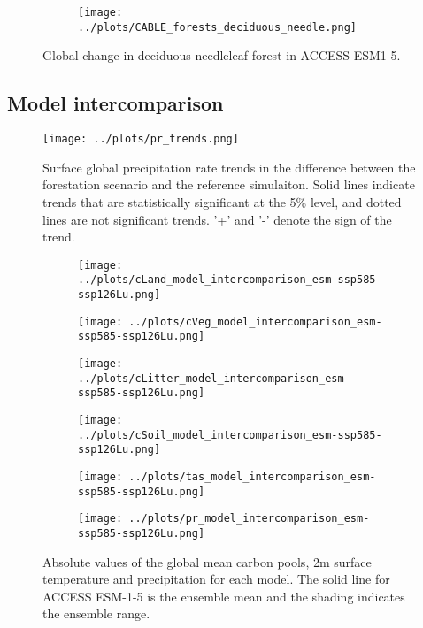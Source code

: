 \documentclass[]{article}
\begin{document}
\begin{figure}[H]
    \centering
    \begin{subfigure}[b]{0.45\linewidth}
        \texttt{[image: ../plots/CABLE\_forests\_deciduous\_needle.png]}
    \end{subfigure}
    \caption{Global change in deciduous needleleaf forest in ACCESS-ESM1-5.}
    \label{fig:ACCESS_dec_needle_cover}
\end{figure}

\subsection{Model intercomparison}

\begin{figure}[H]
    \centering
    \texttt{[image: ../plots/pr\_trends.png]}
    \caption{Surface global precipitation rate trends in the difference between the forestation scenario and the reference simulaiton. Solid lines indicate trends that are statistically significant at the 5\% level, and dotted lines are not significant trends. '+' and '-' denote the sign of the trend.}
    \label{fig:models_pr_trends}
\end{figure}

\begin{figure}[H]
    \centering
    \begin{subfigure}[b]{0.45\linewidth}
        \texttt{[image: ../plots/cLand\_model\_intercomparison\_esm-ssp585-ssp126Lu.png]}
    \end{subfigure}
    \begin{subfigure}[b]{0.45\linewidth}
        \texttt{[image: ../plots/cVeg\_model\_intercomparison\_esm-ssp585-ssp126Lu.png]}
    \end{subfigure}
    \begin{subfigure}[b]{0.45\linewidth}
        \texttt{[image: ../plots/cLitter\_model\_intercomparison\_esm-ssp585-ssp126Lu.png]}
    \end{subfigure}
    \begin{subfigure}[b]{0.45\linewidth}
        \texttt{[image: ../plots/cSoil\_model\_intercomparison\_esm-ssp585-ssp126Lu.png]}
    \end{subfigure}
    \begin{subfigure}[b]{0.45\linewidth}
        \texttt{[image: ../plots/tas\_model\_intercomparison\_esm-ssp585-ssp126Lu.png]}
    \end{subfigure}
    \begin{subfigure}[b]{0.45\linewidth}
        \texttt{[image: ../plots/pr\_model\_intercomparison\_esm-ssp585-ssp126Lu.png]}
    \end{subfigure}
    \caption{Absolute values of the global mean carbon pools, 2m surface temperature and precipitation for each model. The solid line for ACCESS ESM-1-5 is the ensemble mean and the shading indicates the ensemble range.}
    \label{fig:models_absolute}
\end{figure}
\end{document}
